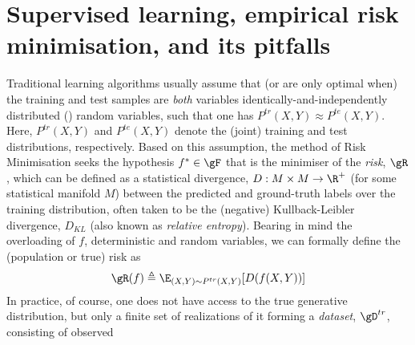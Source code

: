 \section{Supervised learning, empirical risk minimisation, and its pitfalls}\label{sec:iid}

Traditional learning algorithms usually assume  that (or are only optimal when) the training and
test samples are \emph{both} variables identically-and-independently distributed (\iid{}) random
variables, such that one has \( P^{tr}(X, Y) \approx P^{te}(X, Y) \). 
%
Here, \( P^{tr}(X, Y) \) and \( P^{te}(X, Y) \) denote the (joint) training and test distributions,
respectively.
%
Based on this assumption, the method of Risk Minimisation  seeks the hypothesis \( f^\ast \in \gF
\) that is the minimiser of the \emph{risk}, $\gR$, which can be defined as a statistical
divergence, \( D: M \times M \to \R^+ \) (for some statistical manifold \(M\)) between the
predicted and ground-truth labels over the training distribution, often taken to be the (negative)
Kullback-Leibler divergence, \( D_{KL} \) (also known as \emph{relative entropy}).
%
%
Bearing in mind the overloading of \(f\), \wrt{} deterministic and random variables, we can
formally define the (population or true) risk as
%
\begin{equation}\label{eq:pop_risk} \gR (f) \triangleq \E_{ (X, Y) \sim P^{tr}(X, Y) } [ D ( f(X,
    Y) )]
\end{equation}
%
In practice, of course, one does not have access to the true generative distribution, but only a
finite set of realizations of it forming a \emph{dataset}, \( \gD^{tr} \), consisting of observed
